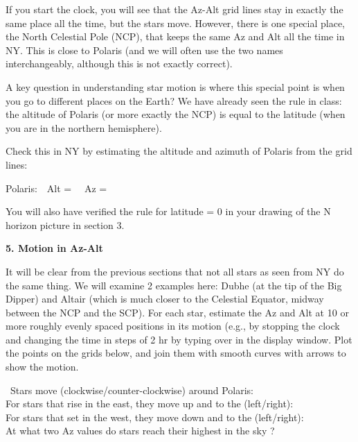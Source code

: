 If you start the clock, you will see that the Az-Alt
grid lines stay in exactly the same place all the time, but the stars
move. However, there is one special place, the North Celestial Pole
(NCP), that keeps the same Az and Alt all the time in NY. This is
close to Polaris (and we will often use the two names interchangeably,
although this is not exactly correct).

A key question in understanding star motion is where this special
point is when you go to different places on the Earth?  We have
already seen the rule in class: the altitude of Polaris (or more
exactly the NCP) is equal to the latitude (when you are in the northern
hemisphere).

\bigskip
Check this in NY by estimating the altitude and azimuth of Polaris
from the grid lines:
\bigskip

Polaris:\ \ Alt = \makebox[4cm]{\hrulefill} \ \ Az =  \makebox[4cm]{\hrulefill}

\bigskip
You will also have verified the rule for latitude = 0 in your drawing
of the N horizon picture in section 3.

\vspace{4cm}
\bigskip\noindent
\clearpage
{\bf 5. Motion in Az-Alt}

\medskip\noindent
It will be clear from the previous sections that not all stars as seen
from NY do the same thing. We will examine 2 examples here: Dubhe (at
the tip of the Big Dipper) and Altair (which is much closer to the
Celestial Equator, midway between the NCP and the SCP).  For each
star, estimate the Az and Alt at 10 or more roughly evenly spaced
positions in its motion (e.g., by stopping the clock and changing the
time in steps of 2 hr by typing over in the display window. Plot the
points on the grids below, and join them with smooth curves with
arrows to show the motion.

        \begin{figure*}[h]
        \centerline{}
        \caption{}
         \end{figure*}

\,
\bigskip
\noindent
Stars move (clockwise/counter-clockwise) around Polaris:\
\makebox[4cm]{\hrulefill}\\ 
For stars that rise in the east, they move up and to the
(left/right): \makebox[4cm]{\hrulefill}\\ 
For stars that set in the west, they move down and to the
(left/right): \makebox[4cm]{\hrulefill}\\ 
At what two Az values do  stars reach their highest in the sky ?\
\makebox[4cm]{\hrulefill} \\



